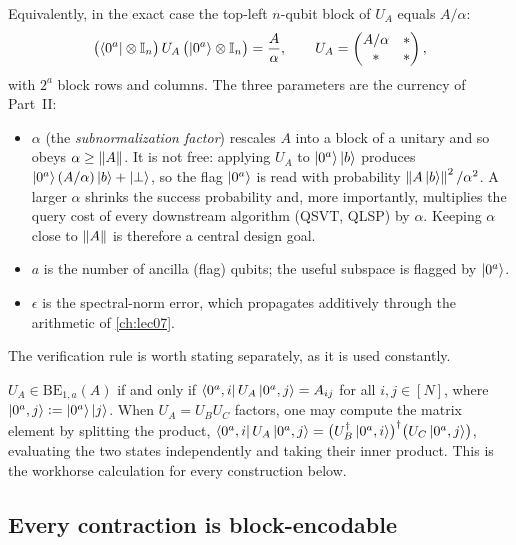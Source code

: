 Equivalently, in the exact case the top-left $n$-qubit block of $U_A$ equals
$A/\alpha$:
\begin{equation}
  \bigl(\bra{0^a}\otimes\mathbb{I}_n\bigr)\,U_A\,\bigl(\ket{0^a}\otimes\mathbb{I}_n\bigr)
  =\frac{A}{\alpha},
  \qquad
  U_A=\begin{pmatrix} A/\alpha & \ast\\ \ast & \ast\end{pmatrix},
  \label{eq:lec06-bealt}
\end{equation}
with $2^{a}$ block rows and columns. The three parameters are the currency of
Part~II:
\begin{itemize}[leftmargin=1.4em,nosep]
  \item $\alpha$ (the \emph{subnormalization factor}) rescales $A$ into a block of a
        unitary and so obeys $\alpha\ge\left\lVert A \right\rVert$. It is not free: applying $U_A$ to
        $\ket{0^a}\ket{b}$ produces $\ket{0^a}(A/\alpha)\ket{b}+\ket{\perp}$, so the
        flag $\ket{0^a}$ is read with probability
        $\left\lVert A\ket{b} \right\rVert^2/\alpha^2$. A larger $\alpha$ shrinks the success
        probability and, more importantly, multiplies the query cost of every
        downstream algorithm (QSVT, QLSP) by $\alpha$. Keeping $\alpha$ close to
        $\left\lVert A \right\rVert$ is therefore a central design goal.
  \item $a$ is the number of ancilla (flag) qubits; the useful subspace is flagged
        by $\ket{0^a}$.
  \item $\epsilon$ is the spectral-norm error, which propagates additively through
        the arithmetic of \cref{ch:lec07}.
\end{itemize}

The verification rule is worth stating separately, as it is used constantly.

\begin{remark}
\label{rem:lec06-verify}
$U_A\in\mathrm{BE}_{1,a}(A)$ if and only if
$\bra{0^a,i}U_A\ket{0^a,j}=A_{ij}$ for all $i,j\in[N]$, where
$\ket{0^a,j}\vcentcolon=\ket{0^a}\ket{j}$. When $U_A=U_BU_C$ factors, one may compute the
matrix element by splitting the product,
$\bra{0^a,i}U_A\ket{0^a,j}=\bigl(U_B^{\dagger}\ket{0^a,i}\bigr)^{\dagger}\bigl(U_C\ket{0^a,j}\bigr)$,
evaluating the two states independently and taking their inner product. This is the
workhorse calculation for every construction below.
\end{remark}

\subsection*{Every contraction is block-encodable}

